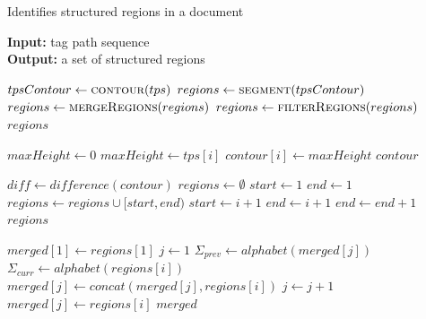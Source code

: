 \documentclass{vldb}
\begin{document}
\begin{algorithm}
\caption{Identifies structured regions in a document}
\label{alg:idreg}
\textbf{Input:} tag path sequence \\
\textbf{Output:} a set of structured regions

\begin{algorithmic}[1]

 
\State $tpsContour \leftarrow \Call{contour}{tps}$
\State $regions \leftarrow \Call{segment}{tpsContour}$
\State $regions \leftarrow \Call{mergeRegions}{regions}$
\State $regions \leftarrow \Call{filterRegions}{regions}$
\State \Return $regions$
\EndFunction


 \label{line:alg:idreg:contour:begin}
\State $maxHeight \leftarrow 0$ 
\label{line:alg:idreg:a}
\label{line:alg:idreg:b}
\State $maxHeight \leftarrow tps[i]$ 
\EndIf 
\State $contour[i] \leftarrow maxHeight$ 
\EndFor\label{line:alg:idreg:c} 
\State \Return $contour$ \label{line:alg:idreg:d} 
\EndFunction\label{line:alg:idreg:contour:end}


 
\State $diff \leftarrow difference(contour)$\label{line:alg:idreg:e}
\State $regions \leftarrow \emptyset$\label{line:alg:idreg:f}
\State $start \leftarrow 1$
\State $end \leftarrow 1$
\State $regions \leftarrow regions \cup [start, end)$
\EndIf
\State $start \leftarrow i + 1$
\State $end \leftarrow i + 1$
\Else
\State $end \leftarrow end + 1$
\EndIf
\EndFor\label{line:alg:idreg:g}
\State \Return $regions$\label{line:alg:idreg:h}
\EndFunction


 
\State $merged[1] \leftarrow regions[1]$
\State $j \leftarrow 1$ 
\label{line:alg:idreg:i}
\State $\Sigma_{prev} \leftarrow alphabet(merged[j])$ \label{line:alg:idreg:j}
\State $\Sigma_{curr} \leftarrow alphabet(regions[i])$
\State $merged[j] \leftarrow concat(merged[j], regions[i])$
\Else 
\State $j \leftarrow j + 1$ 
\State $merged[j] \leftarrow regions[i]$ 
\EndIf \label{line:alg:idreg:k}
\EndFor
\State 
\Return $merged$ \label{line:alg:idreg:l}
\EndFunction


\end{algorithmic}
\end{algorithm}
\end{document}
